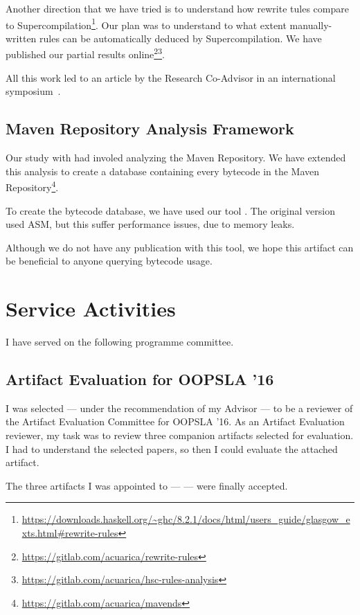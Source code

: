 Another direction that we have tried is to understand how rewrite tules compare to Supercompilation\footnote{\url{https://downloads.haskell.org/~ghc/8.2.1/docs/html/users_guide/glasgow_exts.html\#rewrite-rules}}.
Our plan was to understand to what extent manually-written rules can be automatically deduced by Supercompilation.
We have published our partial results online\footnote{\url{https://gitlab.com/acuarica/rewrite-rules}}\footnote{\url{https://gitlab.com/acuarica/hsc-rules-analysis}}.

All this work led to an article by the Research Co-Advisor in an international symposium~\cite{Nystrom:2017:SFS:3136000.3136011}.

\subsection*{Maven Repository Analysis Framework}

Our study with \smu{} had involed analyzing the Maven Repository.
We have extended this analysis to create a database containing every bytecode in the Maven Repository\footnote{\url{https://gitlab.com/acuarica/mavends}}.

To create the bytecode database, we have used our tool \jnif{}.
The original version used ASM, but this suffer performance issues, due to memory leaks. 

Although we do not have any publication with this tool, we hope this artifact can be beneficial to anyone querying bytecode usage.

\section{Service Activities} \label{sec:service}

I have served on the following programme committee.

\subsection*{Artifact Evaluation for OOPSLA '16}

I was selected --- under the recommendation of my Advisor --- to be a reviewer of the Artifact Evaluation Committee for OOPSLA '16.
As an Artifact Evaluation reviewer, my task was to review three companion artifacts selected for evaluation.
I had to understand the selected papers, so then I could evaluate the attached artifact.

The three artifacts I was appointed to --- \cite{Ancona:2016:SSI:2983990.2983992,DiLorenzo:2016:IFD:2983990.2984034,Stefanescu:2016:SPV:2983990.2984027} --- were finally accepted.


